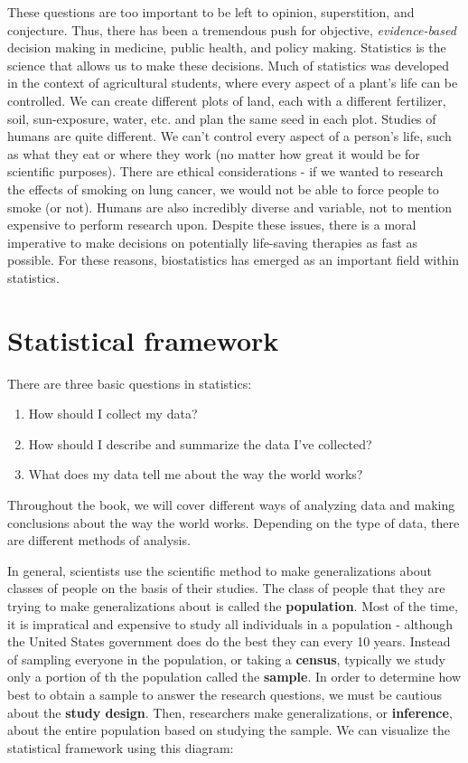 \documentclass[
]{book}
\providecommand{\tightlist}{%
  \setlength{\itemsep}{0pt}\setlength{\parskip}{0pt}}
\theoremstyle{definition}
\theoremstyle{definition}
\theoremstyle{definition}
\theoremstyle{remark}
\begin{document}
These questions are too important to be left to opinion, superstition, and conjecture. Thus, there has been a tremendous push for objective, \emph{evidence-based} decision making in medicine, public health, and policy making. Statistics is the science that allows us to make these decisions. Much of statistics was developed in the context of agricultural students, where every aspect of a plant's life can be controlled. We can create different plots of land, each with a different fertilizer, soil, sun-exposure, water, etc. and plan the same seed in each plot. Studies of humans are quite different. We can't control every aspect of a person's life, such as what they eat or where they work (no matter how great it would be for scientific purposes). There are ethical considerations - if we wanted to research the effects of smoking on lung cancer, we would not be able to force people to smoke (or not). Humans are also incredibly diverse and variable, not to mention expensive to perform research upon. Despite these issues, there is a moral imperative to make decisions on potentially life-saving therapies as fast as possible. For these reasons, biostatistics has emerged as an important field within statistics.

\hypertarget{ch1_s4}{%
\section{Statistical framework}\label{ch1_s4}}

There are three basic questions in statistics:

\begin{enumerate}
\def\labelenumi{\arabic{enumi})}
\tightlist
\item
  How should I collect my data?\\
\item
  How should I describe and summarize the data I've collected?
\item
  What does my data tell me about the way the world works?
\end{enumerate}

Throughout the book, we will cover different ways of analyzing data and making conclusions about the way the world works. Depending on the type of data, there are different methods of analysis.

In general, scientists use the scientific method to make generalizations about classes of people on the basis of their studies. The class of people that they are trying to make generalizations about is called the \textbf{population}. Most of the time, it is impratical and expensive to study all individuals in a population - although the United States government does do the best they can every 10 years. Instead of sampling everyone in the population, or taking a \textbf{census}, typically we study only a portion of th the population called the \textbf{sample}. In order to determine how best to obtain a sample to answer the research questions, we must be cautious about the \textbf{study design}. Then, researchers make generalizations, or \textbf{inference}, about the entire population based on studying the sample. We can visualize the statistical framework using this diagram:
\end{document}
